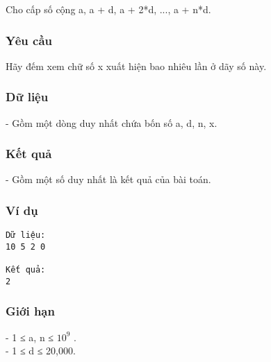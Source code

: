 



   Cho cấp số cộng a, a + d, a + 2*d, ..., a + n*d.  

\subsubsection{   Yêu cầu  }

   Hãy đếm xem chữ số x xuất hiện bao nhiêu lần ở dãy số này.  

\subsubsection{   Dữ liệu  }

   - Gồm một dòng duy nhất chứa bốn số a, d, n, x.  

\subsubsection{   Kết quả  }

   - Gồm một số duy nhất là kết quả của bài toán.  

\subsubsection{   Ví dụ  }
\begin{verbatim}
Dữ liệu:
10 5 2 0

Kết quả:
2
\end{verbatim}

\subsubsection{   Giới hạn  }

   - 1 ≤ a, n ≤ $10^{9}$   .   
\\   - 1 ≤ d ≤ 20,000.  
